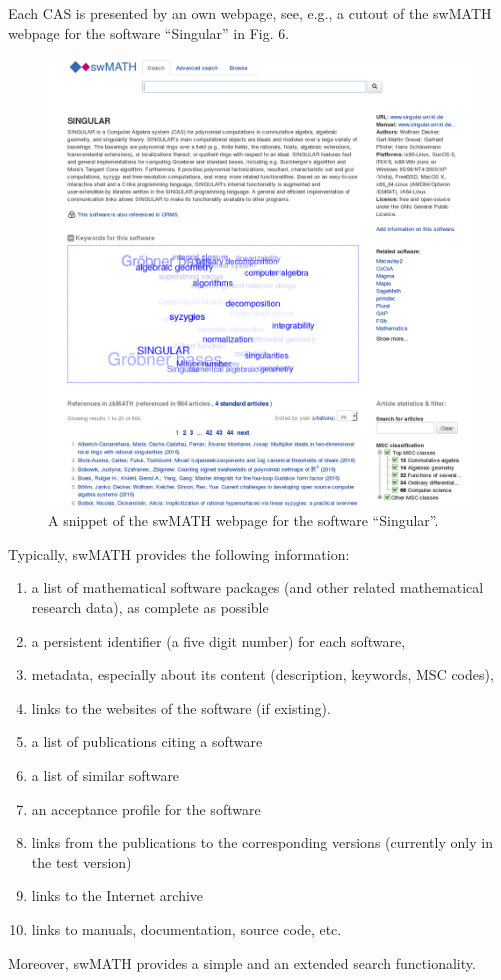 \documentclass[12pt]{article}
\begin{document}
Each CAS is presented by an own webpage, see, e.g., a cutout of the swMATH
webpage for the software ``Singular'' in Fig. 6.
\begin{figure}[ht]
  \centering
  \includegraphics[width=.6\textwidth]{aca6}
  \caption{A snippet of the swMATH webpage for the software
    ``Singular''.\label{abb_6}}
\end{figure}

Typically, swMATH provides the following information:
\begin{enumerate}
\item a list of mathematical software packages (and other related mathematical
  research data), as complete as possible
\item a persistent identifier (a five digit number) for each software,
\item metadata, especially about its content (description, keywords, MSC
  codes),
\item links  to the websites of the software (if existing).
\item a list of publications citing a software
\item a list of similar software
\item an acceptance profile for the software
\item links from the publications to the corresponding versions (currently only
  in the test version)
\item links to the Internet archive
\item links to manuals, documentation, source code, etc.
\end{enumerate}

Moreover, swMATH provides a simple and an extended search functionality.
\end{document}
